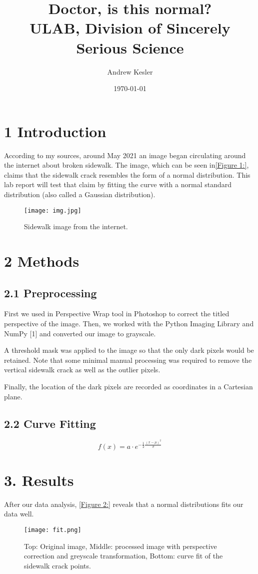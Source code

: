 \documentclass{article}
\title{Doctor, is this normal?\\ULAB, Division of Sincerely Serious Science}
\author{Andrew Kesler}
\date{\today}
\begin{document}
 


\maketitle
\section{1 Introduction}
According to my sources, around May 2021 an image began circulating around the internet about broken sidewalk. The image, which can be seen in\autoref{Figure 1:}, claims that the sidewalk crack resembles the form of a normal distribution. This lab report will test that claim by fitting the curve with a normal standard distribution (also called a Gaussian distribution). 
\begin{figure}[h]
        \centering
        \texttt{[image: img.jpg]}
        \caption{Sidewalk image from the internet.}
        \label{Figure 1:}
        \end{figure}
\section{2 Methods}
\subsection{2.1 Preprocessing}
First we used in Perspective Wrap tool in Photoshop to correct the titled perspective of the image. Then, we worked with the Python Imaging Library and NumPy [1] and converted our image to grayscale. 

A threshold mask was applied to the image so that the only  dark pixels would be retained. Note that some minimal manual processing was required to remove the vertical sidewalk crack as well as the outlier pixels.

Finally, the location of the dark pixels are recorded as coordinates in a Cartesian plane. 
\subsection{2.2 Curve Fitting}
\begin{equation}
f(x) = a \cdot e^{- \frac{1}{2} \frac{(x - \mu)^2}{\sigma}}
\end{equation}
\section{3. Results}
After our data analysis, \autoref{Figure 2:} reveals that a normal distributions fits our data well. 
\begin{figure}[h]
    \centering
    \texttt{[image: fit.png]}
    \caption{Top: Original image, Middle: processed image with perspective correction and greyscale transformation, Bottom: curve fit of the sidewalk crack points.}
    \label{Figure 2:}
\end{figure}    
\end{document}

